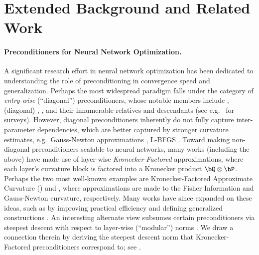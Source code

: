 \section{Extended Background and Related Work}
\label{sec:related_work}
\paragraph{Preconditioners for Neural Network Optimization.}
A significant research effort in neural network optimization has been dedicated to understanding the role of preconditioning in convergence speed and generalization. Perhaps the most widespread paradigm falls under the category of \textit{entry-wise} (``diagonal'') preconditioners, whose notable members include \Adam \cite{kingma2014adam}, (diagonal) \AdaGrad \cite{duchi2011adaptive}, \RMSprop \cite{tieleman2012lecture}, and their innumerable relatives and descendants (see e.g.\ \citet{schmidt2021descending, dahl2023benchmarking} for surveys). However, diagonal preconditioners inherently do not fully capture inter-parameter dependencies, which are better captured by stronger curvature estimates, e.g.\ Gauss-Newton approximations \cite{botev2017practical, martens2020new}, L-BFGS \cite{byrd2016stochastic, bollapragada2018progressive, goldfarb2020practical}. Toward making non-diagonal preconditioners scalable to neural networks, many works (including the above) have made use of layer-wise \emph{Kronecker-Factored} approximations, where each layer's curvature block is factored into a Kronecker product $\bQ \otimes \bP$. Perhaps the two most well-known examples are Kronecker-Factored Approximate Curvature (\KFAC) \cite{martens2015optimizing} and \Shampoo \cite{gupta2018shampoo, anil2020scalable}, where approximations are made to the Fisher Information and Gauss-Newton curvature, respectively. Many works have since expanded on these ideas, such as by improving practical efficiency \cite{ba2017distributed, shi2023distributed, jordan2024muon, vyas2024soap} and defining generalized constructions \cite{dangel2020modular, amid2022locoprop, benzing2022gradient}. An interesting alternate view subsumes certain preconditioners via steepest descent with respect to layer-wise (``modular'') norms \cite{large2024scalable, bernstein2024modular, bernstein2024old}. We draw a connection therein by deriving the steepest descent norm that Kronecker-Factored preconditioners correspond to; see .

